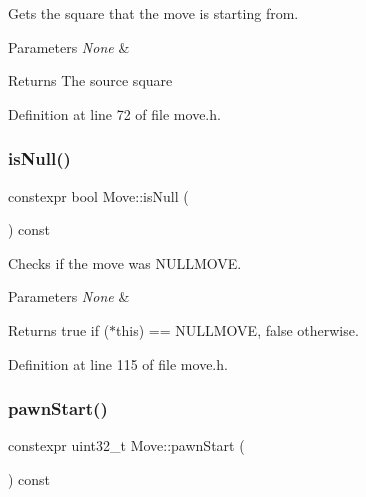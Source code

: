Gets the square that the move is starting from. 


\begin{DoxyParams}{Parameters}
{\em None} & \\
\hline
\end{DoxyParams}
\begin{DoxyReturn}{Returns}
The source square 
\end{DoxyReturn}


Definition at line 72 of file move.\+h.

\mbox{\label{classMove_ac986baf2580e64f47828c8adf23a25f0}} 
\subsubsection{\texorpdfstring{is\+Null()}{isNull()}}
{\footnotesize\ttfamily constexpr bool Move\+::is\+Null (\begin{DoxyParamCaption}{ }\end{DoxyParamCaption}) const\hspace{0.3cm}{\ttfamily [inline]}}



Checks if the move was N\+U\+L\+L\+M\+O\+VE. 


\begin{DoxyParams}{Parameters}
{\em None} & \\
\hline
\end{DoxyParams}
\begin{DoxyReturn}{Returns}
true if ($\ast$this) == N\+U\+L\+L\+M\+O\+VE, false otherwise. 
\end{DoxyReturn}


Definition at line 115 of file move.\+h.

\mbox{\label{classMove_ae9eaee49438859900541d7a308161a8b}} 
\subsubsection{\texorpdfstring{pawn\+Start()}{pawnStart()}}
{\footnotesize\ttfamily constexpr uint32\+\_\+t Move\+::pawn\+Start (\begin{DoxyParamCaption}{ }\end{DoxyParamCaption}) const\hspace{0.3cm}{\ttfamily [inline]}}



